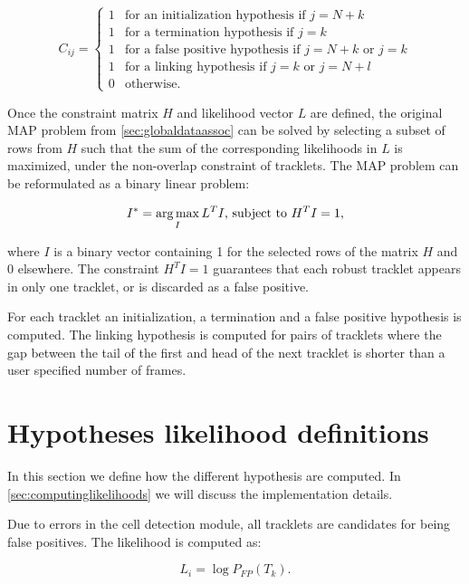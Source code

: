 		\[
			C_{ij} = \begin{cases}
			1 & \text{for an initialization hypothesis if } j = N + k \\
			1 & \text{for a termination hypothesis if } j = k \\
			1 & \text{for a false positive hypothesis if } j = N + k \text{ or } j = k \\
			1 & \text{for a linking hypothesis if } j = k \text{ or } j = N + l \\
			0 & \text{otherwise.}
			\end{cases}
		\]
		
		Once the constraint matrix $H$ and likelihood vector $L$ are defined, the original MAP problem from \cref{sec:globaldataassoc} can be solved by selecting a subset of rows from $H$ such that the sum of the corresponding likelihoods in $L$ is maximized, under the non-overlap constraint of tracklets. The MAP problem can be reformulated as a binary linear problem:
		
		\[
			I^* = \operatorname*{arg\,max}_I L^T I \text{,    subject to } H^T I = 1 \text{,}
		\]
		
		\noindent where $I$ is a binary vector containing 1 for the selected rows of the matrix $H$ and 0 elsewhere. The constraint $H^T I = 1$ guarantees that each robust tracklet appears in only one tracklet, or is discarded as a false positive.
	 
		For each tracklet an initialization, a termination and a false positive hypothesis is computed. The linking hypothesis is computed for pairs of tracklets where the gap between the tail of the first and head of the next tracklet is shorter than a user specified number of frames.
	 	        		
	 	        		
	\section{Hypotheses likelihood definitions \statusfirstdraft}
		\label{sec:hypothesisdefinition}
		In this section we define how the different hypothesis are computed. In \cref{sec:computinglikelihoods} we will discuss the implementation details.
		
		Due to errors in the cell detection module, all tracklets are candidates for being false positives. The  likelihood is computed as:
		
		\[
			L_i = \log P_{FP}(T_k)\text{.}
		\]
		
